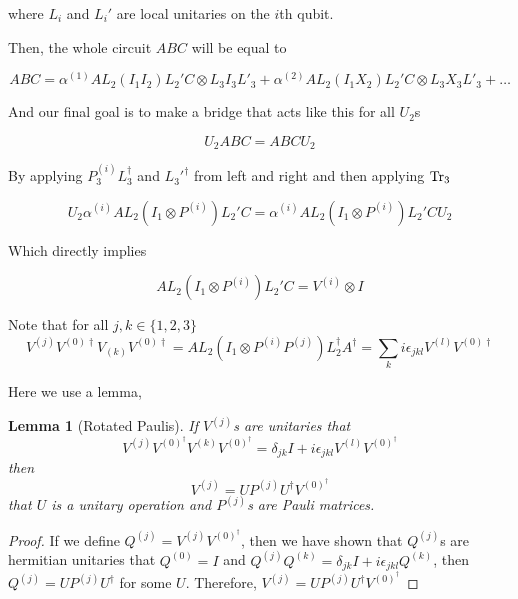 \documentclass{report}
\newtheorem{lemma}{Lemma}
\begin{document}
where $L_i$ and $L_i'$ are local unitaries on the $i$th qubit.

Then, the whole circuit $ABC$ will be equal to 

\begin{equation}
  ABC = \alpha^{(1)} AL_2 (I_1 I_2) L_2' C \otimes L_3 I_3 L'_3 + \alpha^{(2)} AL_2 (I_1 X_2) L_2' C \otimes L_3 X_3 L'_3 + \dots
\end{equation}

And our final goal is to make a bridge that acts like this for all $U_2$s

\begin{equation}
  U_2 ABC = ABC U_2
\end{equation}

By applying $P^{(i)}_3 L_3^\dagger$ and ${L_3'}^\dagger$ from left and right and then applying $\Tr_3$

\begin{equation}
  U_2 \alpha^{(i)} AL_2 (I_1 \otimes P^{(i)}) L_2' C = \alpha^{(i)} AL_2 (I_1 \otimes  P^{(i)}) L_2' C U_2
\end{equation}

Which directly implies

\begin{equation}
  AL_2 (I_1 \otimes P^{(i)}) L_2' C = V^{(i)} \otimes I
\end{equation}

Note that for all $j, k \in \{1, 2, 3\}$
\begin{equation}
  V^{(j)} V^{(0)\dagger} V_{(k)} V^{(0)\dagger} = AL_2 (I_1 \otimes P^{(i)} P^{(j)}) L_2^\dagger A^\dagger = \sum_k i\epsilon_{jkl} V^{(l)}V^{(0)\dagger}
\end{equation}

Here we use a lemma,
\begin{lemma}[Rotated Paulis]
  If $V^{(j)}$s are unitaries that
  \begin{equation}
    V^{(j)} V^{(0)^\dagger} V^{(k)} V^{(0)^\dagger} = \delta_{jk}I + i\epsilon_{jkl} V^{(l)} V^{(0)^\dagger}
  \end{equation}
  then 
  \begin{equation}
    V^{(j)} = U P^{(j)} U^\dagger V^{(0)^\dagger}
  \end{equation}
  that $U$ is a unitary operation and $P^{(j)}$s are Pauli matrices.
\end{lemma}
\begin{proof}
  If we define $Q^{(j)} = V^{(j)} V^{(0)^\dagger}$, then we have shown that $Q^{(j)}$s are hermitian unitaries that $Q^{(0)} = I$ and $Q^{(j)}Q^{(k)} = \delta_{jk}I + i\epsilon_{jkl} Q^{(k)}$, then $Q^{(j)} = U P^{(j)} U^\dagger$ for some $U$.
  Therefore, $V^{(j)} = U P^{(j)} U^\dagger V^{(0)^\dagger}$
\end{proof}
\end{document}
